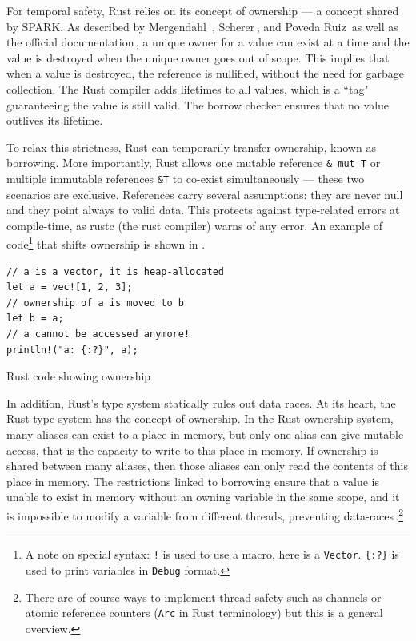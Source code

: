 \documentclass[nomenclature, english, bibtex]{kththesis}
\newcommand{\inlinecode}[1]{\texttt{#1}}
\begin{document}
For temporal safety, Rust relies on its concept of ownership --- a concept shared by SPARK. As described by Mergendahl \etal\,\cite{mergendahl_cross-language_2022}, Scherer\,\cite{scherer_engineering_2021}, and Poveda Ruiz\,\cite{poveda_ruiz_bounded_2019} as well as the official documentation\,\cite{noauthor_rust_nodate}, a unique owner for a value can exist at a time and the value is destroyed when the unique owner goes out of scope.  This implies that when a value is destroyed, the reference is nullified, without the need for garbage collection. The Rust compiler adds lifetimes to all values, which is a ``tag" guaranteeing the value is still valid. The borrow checker ensures that no value outlives its lifetime.
 
To relax this strictness, Rust can temporarily transfer ownership, known as borrowing. More importantly, Rust allows one mutable reference \inlinecode{\& mut T} or multiple immutable references \inlinecode{\&T} to co-exist  simultaneously --- these two scenarios are exclusive. References carry several assumptions: \first they are never null and \Second they point always to valid data. 
This  protects against type-related errors at compile-time, as rustc (the rust compiler) warns of any error. An example of code\footnote{A note on special syntax: \texttt{!} is used to use a macro, here is a \texttt{Vector}. \texttt{\{:?\}} is used to print variables in \texttt{Debug} format.} that shifts ownership is shown in .
 
\begin{listing}[!ht]
\begin{verbatim}
// a is a vector, it is heap-allocated
let a = vec![1, 2, 3]; 
// ownership of a is moved to b
let b = a;   
// a cannot be accessed anymore!
println!("a: {:?}", a);
\end{verbatim}
\caption[Rust code showing ownership]{Rust code showing ownership}
\label{lst:rust_ownership}
\end{listing}

In addition, Rust's type system statically rules out data races. At its heart, the Rust type-system has the concept of ownership. In the Rust ownership system, many aliases can exist to a place in memory, but only one alias can give mutable access, that is the capacity to write to this place in memory. If ownership is shared between many aliases, then those aliases can only read the contents of this place in memory. The restrictions linked to borrowing ensure that a value is unable to exist in memory without an owning variable in the same scope, and it is impossible to modify a variable from different threads, preventing data-races\,\cite{poveda_ruiz_bounded_2019,noauthor_rust_nodate}.\footnote{There are of course ways to implement thread safety such as channels or atomic reference counters (\texttt{Arc} in Rust terminology) but this is a general overview.}
\end{document}
